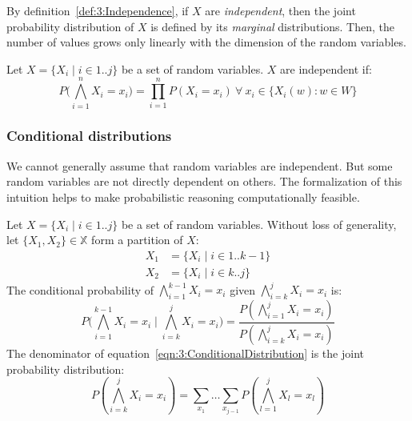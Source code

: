 By definition~\ref{def:3:Independence}, if $X$ are \textit{independent}, then
the joint probability distribution of $X$ is defined by its \textit{marginal}
distributions.
Then, the number of values grows only linearly with the dimension of the random
variables.

\begin{dfn}[Independence]
  \label{def:3:Independence}
  Let $X = \{ X_i \mid i \in 1 .. j \}$ be a set of random variables.
  $X$ are independent if:
  \begin{equation}
    P \bigl( \bigwedge_{i = 1}^{n} X_i = x_i \bigr) = \prod_{i = 1}^{n} P(X_i =
    x_i) \ \forall \ x_i \in \{ X_i(w) : w \in W \}
  \end{equation}
\end{dfn}

\subsubsection{Conditional distributions}

We cannot generally assume that random variables are
independent.
But some random variables are not directly dependent on others.
The formalization of this intuition helps to make probabilistic reasoning
computationally feasible.

\begin{dfn}
  Let $X = \{ X_i \mid i \in 1 .. j \}$ be a set of random variables.
  Without loss of generality, let $\{ X_1, X_2 \} \in \mathbb{X}$ form a
  partition of $X$:
  \begin{align*}
    X_1 & = \{ X_i \mid i \in 1 .. k - 1 \}
    \\
    X_2 & = \{ X_i \mid i \in k .. j \}
  \end{align*}
  The conditional probability of $\bigwedge_{i = 1}^{k - 1} X_i = x_i$
  given $\bigwedge_{i = k}^{j} X_i = x_i$ is:
  \begin{equation}
    \label{eqn:3:ConditionalDistribution}
    P \bigl( \bigwedge_{i = 1}^{k - 1} X_i = x_i \mid \bigwedge_{i = k}^{j} X_i = x_i \bigr)
    = \frac{P(\bigwedge_{i = 1}^{j} X_i = x_i)}{P(\bigwedge_{i = k}^{j} X_i = x_i)}
  \end{equation}
  The denominator of equation~\ref{eqn:3:ConditionalDistribution} is the joint
  probability distribution:
  \begin{equation}
    P(\bigwedge_{i = k}^{j} X_i = x_i) = \sum_{x_1} \ldots \sum_{x_{j - 1}}
    P(\bigwedge_{l = 1}^{j} X_l = x_l)
  \end{equation}
\end{dfn}

